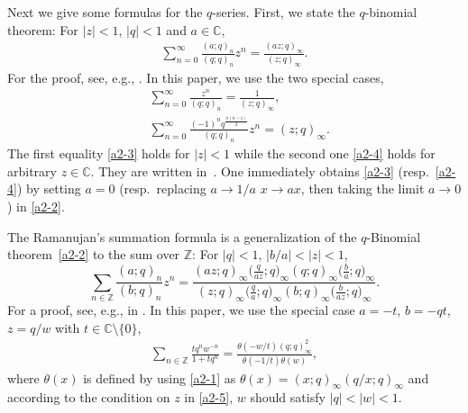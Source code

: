 \documentclass[pdftex]{sigma}
\numberwithin{equation}{section}
\def\C{\mathbb{C}}
\def\i{\infty}
\def\Z{\mathbb{Z}}
\begin{document}
 Next we give some formulas for the $q$-series. First, we state the $q$-binomial theorem:
 For $|z|<1$, $|q|<1$ and $a\in\C$,
\begin{align}
\label{a2-2}
\sum_{n=0}^\i \frac{(a;q)_n}{(q;q)_n} z^n
=
\frac{(az;q)_\i}{(z;q)_{\i}}.
\end{align}
For the proof, see, e.g., \cite[Theorem 10.2.1]{AndrewsAskeyRoy2000}. In this paper,
we use the two special cases,
\begin{align}
\label{a2-3}
&\sum_{n=0}^\i \frac{z^n}{(q;q)_n}
=
\frac{1}{(z;q)_{\i}},
\\
 \label{a2-4}
&\sum_{n=0}^\i \frac{(-1)^n q^{\frac{n(n-1)}{2}}}{(q;q)_n} z^n
= (z;q)_\i.
\end{align}
 The first equality \eqref{a2-3} holds for $|z|<1$ while the second one \eqref{a2-4} holds for arbitrary $z\in\C$. They are written in~\cite[Corollary
 10.2.2\,(a) and (b)]{AndrewsAskeyRoy2000}.
 One immediately obtains \eqref{a2-3} (resp.~\eqref{a2-4})
 by setting $a=0$ (resp.\ replacing
 $a\rightarrow 1/a$ $x\rightarrow ax$, then taking the limit $a\rightarrow 0$) in \eqref{a2-2}.

 The Ramanujan's summation formula is a
 generalization of the $q$-Binomial
 theorem~\eqref{a2-2} to the sum over
 $\Z$: For $|q|<1$, $|b/a|<|z|<1$,
\begin{equation}
\label{a2-5}
\sum_{n\in\Z} \frac{(a;q)_n}{(b;q)_n} z^n
=
\frac{(az;q)_\i \big(\frac{q}{az};q\big)_\i (q;q)_\i \big(\frac{b}{a};q\big)_\i}
 {(z;q)_\i \big(\frac{q}{a};q\big)_\i (b;q)_\i \big(\frac{b}{az};q\big)_\i}.
\end{equation}
 For a proof, see, e.g., in \cite[Theorem 10.5.1]{AndrewsAskeyRoy2000}.
 In this paper, we use the special case
 $a=-t$, $b=-qt$, $z=q/w$ with
 $t\in \C\setminus\{0\}$,
\begin{align}
 \label{a2-6}
 \sum_{n\in\Z}\frac{t q^n w^{-n}}{1+tq^n}
 =
 \frac{\theta(-w/t)(q;q)_{\i}^2}
 {\theta(-1/t)\theta(w)},
\end{align}
 where $\theta (x)$ is defined by using
 \eqref{a2-1} as $\theta(x)=(x;q)_{\i}(q/x;q)_{\i}$
 and
 according to the condition on $z$ in \eqref{a2-5}, $w$ should satisfy $|q|<|w|<1$.
\end{document}
